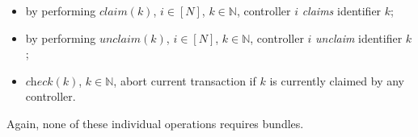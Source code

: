 \documentclass[conference]{sigcomm-alternate}
\newcommand{\Nat}{\mathbb{N}}
\newcommand{\claimcheck}{check\xspace}
\newcommand{\liron}[1]{\textit{\textcolor{mygreen}{[liron]: #1}}} %
\begin{document}
\begin{itemize}
\item by performing $\textit{claim}(k)$, $i\in[N]$,
  $k\in\Nat$, controller $i$ \emph{claims}
  identifier $k$;


\item by performing $\textit{unclaim}(k)$, $i\in[N]$, $k\in\Nat$, controller $i$
  \emph{unclaim} identifier $k$;

\item $\textit{\claimcheck}(k)$, $k\in\Nat$,
abort current transaction if $k$ is currently claimed by any controller.

\end{itemize}

Again, none of these individual operations 
requires bundles.

\end{document}
